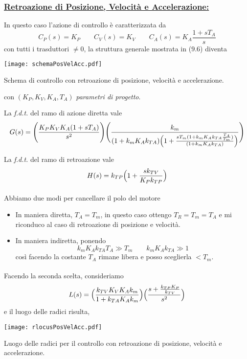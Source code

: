 \subsubsection{\underline{Retroazione di Posizione, Velocità e Accelerazione:}}
In questo caso l'azione di controllo è caratterizzata da 
\begin{equation*}
	C_P(s) = K_P  \qquad C_V(s) = K_V  \qquad C_A(s) = K_A\frac{1+sT_A}{s} 
\end{equation*}
con tutti i trasduttori $\neq 0$, la struttura generale mostrata in ($9.6$) diventa
\begin{center}
	\texttt{[image: schemaPosVelAcc.pdf]}
	\caption{Schema di controllo con retroazione di posizione, velocità e accelerazione.}
\end{center}
con $(K_P, K_V, K_A, T_A)$ \emph{parametri di progetto}. 

La \emph{f.d.t.} del ramo di azione diretta vale 
\begin{equation*}
	G(s) = \Biggl( \frac{K_P K_V K_A (1+sT_A)}{s^2} \Biggr) \Biggl( \frac{k_m}{(1+k_mK_Ak_{TA})\Bigl( 1+\frac{sT_m(1+k_mK_Ak_{TA}\frac{T_A}{T_m})}{(1+k_mK_Ak_{TA})} \Bigr)} \Biggr)
\end{equation*}

La \emph{f.d.t.} del ramo di retroazione vale
\begin{equation}
	H(s) = k_{TP}\Bigl( 1+ \frac{sk_{TV}}{K_Pk_{TP}} \Bigr)
\end{equation}

\paragraph{}
Abbiamo due modi per cancellare il polo del motore 
\begin{itemize}
	\item In maniera diretta, $T_A = T_m$, in questo caso ottengo $T_R = T_m = T_A$ e mi riconduco al caso di retroazione di posizione e velocità.
	\item In maniera indiretta, ponendo
	\begin{equation}
		k_mK_Ak_{TA}T_A \gg T_m \qquad k_mK_Ak_{TA} \gg 1
	\end{equation}
	così facendo la costante $T_A$ rimane libera e posso sceglierla $< T_m$.
\end{itemize}

\paragraph{}
Facendo la seconda scelta, consideriamo 
\begin{equation}
	L(s) = \Bigl( \frac{k_{TV}K_VK_Ak_m}{1+k_{TA}K_Ak_m} \Bigr) \Bigl( \frac{s+\frac{k_{TP} K_P}{k_{TV}}}{s^2} \Bigr)
\end{equation}
e il luogo delle radici risulta,
\begin{center}
	\texttt{[image: rlocusPosVelAcc.pdf]}
	\caption{Luogo delle radici per il controllo con retroazione di posizione, velocità e accelerazione.}
\end{center}

